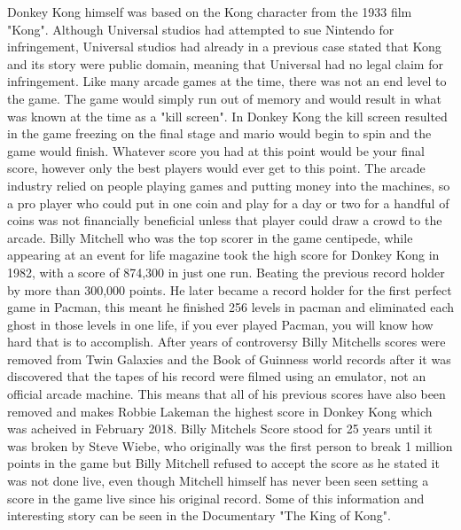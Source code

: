 \documentclass{article}
\begin{document}
Donkey Kong himself was based on the Kong character from the 1933 film "Kong". Although Universal studios had attempted to sue Nintendo for infringement, Universal studios had already in a previous case stated that Kong and its story were public domain, meaning that Universal had no legal claim for infringement. Like many arcade games at the time, there was not an end level to the game. The game would simply run out of memory and would result in what was known at the time as a "kill screen". In Donkey Kong the kill screen resulted in the game freezing on the final stage and mario would begin to spin and the game would finish. Whatever score you had at this point would be your final score, however only the best players would ever get to this point. The arcade industry relied on people playing games and putting money into the machines, so a pro player who could put in one coin and play for a day or two for a handful of coins was not financially beneficial unless that player could draw a crowd to the arcade. \newline \newline
 Billy Mitchell who was the top scorer in the game centipede, while appearing at an event for life magazine took the high score for Donkey Kong in 1982, with a score of 874,300 in just one run. Beating the previous record holder by more than 300,000 points. He later became a record holder for the first perfect game in Pacman, this meant he finished 256 levels in pacman and eliminated each ghost in those levels in one life, if you ever played Pacman, you will know how hard that is to accomplish. \newline \newline
After years of controversy Billy Mitchells scores were removed from Twin Galaxies and the Book of Guinness world records after it was discovered that the tapes of his record were filmed using an emulator, not an official arcade machine. This means that all of his previous scores have also been removed and makes Robbie Lakeman the highest score in Donkey Kong which was acheived in February 2018. Billy Mitchels Score stood for 25 years until it was broken by Steve Wiebe, who originally was the first person to break 1 million points in the game but Billy Mitchell refused to accept the score as he stated it was not done live, even though Mitchell himself has never been seen setting a score in the game live since his original record. Some of this information and interesting story can be seen in the Documentary "The King of Kong". \newline \newline
\end{document}
